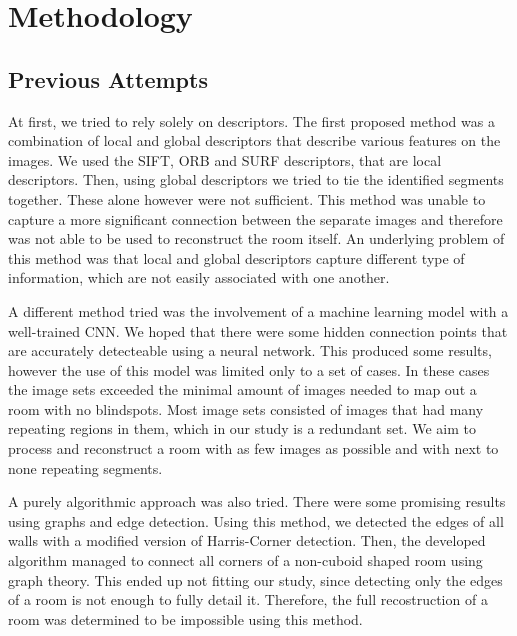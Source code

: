 \section{Methodology}
\label{sec:methodology}

\subsection{Previous Attempts} %
At first, we tried to rely solely on descriptors. The first proposed method was a combination of local and global descriptors that describe various features on the images. We used the SIFT, ORB and SURF descriptors, that are local descriptors. Then, using global descriptors we tried to tie the identified segments together. These alone however were not sufficient. This method was unable to capture a more significant connection between the separate images and therefore was not able to be used to reconstruct the room itself. An underlying problem of this method was that local and global descriptors capture different type of information, which are not easily associated with one another.

A different method tried was the involvement of a machine learning model with a well-trained CNN. We hoped that there were some hidden connection points that are accurately detecteable using a neural network. This produced some results, however the use of this model was limited only to a set of cases. In these cases the image sets exceeded the minimal amount of images needed to map out a room with no blindspots. Most image sets consisted of images that had many repeating regions in them, which in our study is a redundant set. We aim to process and reconstruct a room with as few images as possible and with next to none repeating segments.   

A purely algorithmic approach was also tried. There were some promising results using graphs and edge detection. Using this method, we detected the edges of all walls with a modified version of Harris-Corner detection. Then, the developed algorithm managed to connect all corners of a non-cuboid shaped room using graph theory. This ended up not fitting our study, since detecting only the edges of a room is not enough to fully detail it. Therefore, the full recostruction of a room was determined to be impossible using this method.


